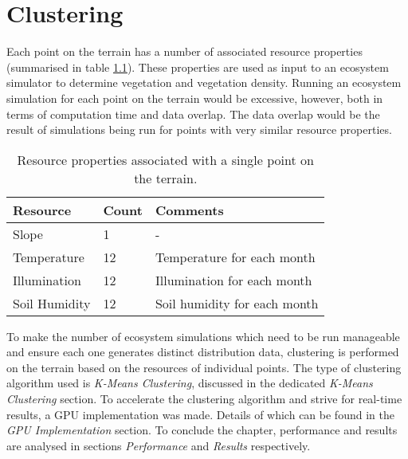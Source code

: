 \chapter{Clustering}

Each point on the terrain has a number of associated resource properties (summarised in table \ref{tab:point_resources}). These properties are used as input to an ecosystem simulator to determine vegetation and vegetation density. Running an ecosystem simulation for each point on the terrain would be excessive, however, both in terms of computation time and data overlap. The data overlap would be the result of simulations being run for points with very similar resource properties.\\

\begin{table}[h]
  \centering
	    \begin{tabular}{|p{6cm}|p{3cm}|p{6cm}|}
		\hline	
  	    \textbf{Resource} & \textbf{Count} & \textbf{Comments} \\
  	    \hline	
  	    Slope & 1 & - \\
		\hline
  	    Temperature & 12 & Temperature for each month \\
		\hline
  	    Illumination & 12 & Illumination for each month \\
		\hline
  	    Soil Humidity & 12 & Soil humidity for each month \\
		\hline
		\end{tabular}
		\caption{Resource properties associated with a single point on the terrain.}
	  \label{tab:point_resources}
\end{table}

To make the number of ecosystem simulations which need to be run manageable and ensure each one generates distinct distribution data, clustering is performed on the terrain based on the resources of individual points. The type of clustering algorithm used is \textit{K-Means Clustering}, discussed in the dedicated \textit{K-Means Clustering} section. To accelerate the clustering algorithm and strive for real-time results, a GPU implementation was made. Details of which can be found in the \textit{GPU Implementation} section. To conclude the chapter, performance and results are analysed in sections \textit{Performance} and \textit{Results} respectively.


